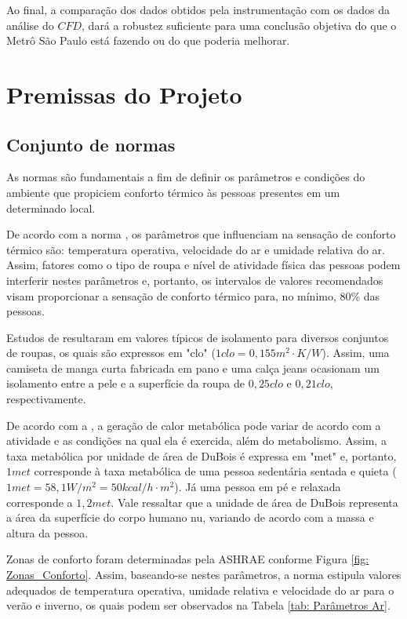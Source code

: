 \documentclass[acronym,symbols]{fei}
\begin{document}
Ao final, a comparação dos dados obtidos pela instrumentação com os dados da análise do $CFD$, dará a robustez suficiente para uma conclusão objetiva do que o Metrô São Paulo está fazendo ou do que poderia melhorar. 

\section{Premissas do Projeto}

\subsection{Conjunto de normas}
As normas são fundamentais a fim de definir os parâmetros e condições do ambiente que propiciem conforto térmico às pessoas presentes em um determinado local.

De acordo com a norma \textcite{abnt216401}, os parâmetros que influenciam na sensação de conforto térmico são: temperatura operativa, velocidade do ar e umidade relativa do ar. Assim, fatores como o tipo de roupa e nível de atividade física das pessoas podem interferir nestes parâmetros e, portanto, os intervalos de valores recomendados visam proporcionar a sensação de conforto térmico para, no mínimo, 80\% das pessoas.

Estudos de \textcite{mccullough1984comprehensive} resultaram em valores típicos de isolamento para diversos conjuntos de roupas, os quais são expressos em "clo" ($1 clo=0,155 m^2\cdot K/W$). Assim, uma camiseta de manga curta fabricada em pano e uma calça jeans ocasionam um isolamento entre a pele e a superfície da roupa de $0,25 clo$ e $0,21 clo$, respectivamente. 

De acordo com a \textcite{ashrae2005ashrae}, a geração de calor metabólica pode variar de acordo com a atividade e as condições na qual ela é exercida, além do metabolismo. Assim, a taxa metabólica por unidade de área de DuBois é expressa em "met" e, portanto, $1 met$ corresponde à taxa metabólica de uma pessoa sedentária sentada e quieta ($1 met=58,1 W/m^2=50kcal/h \cdot m^2$). Já uma pessoa em pé e relaxada corresponde a $1,2 met$. Vale ressaltar que a unidade de área de DuBois representa a área da superfície do corpo humano nu, variando de acordo com a massa e altura da pessoa.


Zonas de conforto foram determinadas pela ASHRAE conforme Figura \ref{fig: Zonas_Conforto}. Assim, baseando-se nestes parâmetros, a norma \textcite{abnt216401} estipula valores adequados de temperatura operativa, umidade relativa e velocidade do ar para o verão e inverno, os quais podem ser observados na Tabela \ref{tab: Parâmetros Ar}. 
\end{document}
